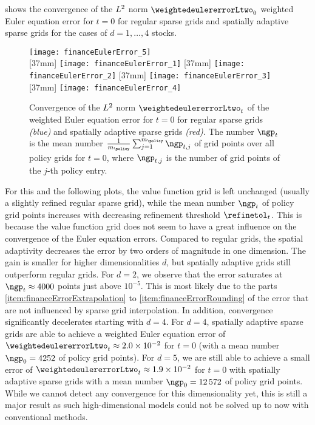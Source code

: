  shows the convergence of the
$L^2$ norm $\weightedeulererrorLtwo_0$
weighted Euler equation error for $t = 0$ for regular sparse grids
and spatially adaptive sparse grids
for the cases of $d = 1, \dotsc, 4$ stocks.
\begin{figure}
  \texttt{[image: financeEulerError\_5]}%
  \\[2mm]%
  [37mm]{%
    \texttt{[image: financeEulerError\_1]}%
  }%
  \hfill%
  [37mm]{%
    \texttt{[image: financeEulerError\_2]}%
  }%
  \hfill%
  [37mm]{%
    \texttt{[image: financeEulerError\_3]}%
  }%
  \hfill%
  [37mm]{%
    \texttt{[image: financeEulerError\_4]}%
  }%
  \caption[Convergence of the weighted Euler equation error]{%
    Convergence of the $L^2$ norm $\weightedeulererrorLtwo_t$
    of the weighted Euler equation error for $t = 0$ for
    regular sparse grids \emph{\textcolor{C0}{(blue)}} and
    spatially adaptive sparse grids \emph{\textcolor{C1}{(red)}.}
    The number $\ngp_t$ is the mean number
    $\frac{1}{m_{\policy}} \sum_{j=1}^{m_{\policy}} \ngp_{t,j}$
    of grid points over all policy grids for $t = 0$,
    where $\ngp_{t,j}$ is the number of grid points
    of the $j$-th policy entry.%
  }%
  \label{fig:financeEulerError}%
\end{figure}%
For this and the following plots,
the value function grid is left unchanged
(usually a slightly refined regular sparse grid),
while the mean number $\ngp_t$ of policy grid points increases
with decreasing refinement threshold $\refinetol_t$.
This is because the value function grid does not seem to have a great influence
on the convergence of the Euler equation errors.
Compared to regular grids, the spatial adaptivity decreases the error by
two orders of magnitude in one dimension.
The gain is smaller for higher dimensionalities $d$,
but spatially adaptive grids still outperform regular grids.
For $d = 2$, we observe that the error saturates
at $\ngp_t \approx \num{4000}$ points just above $10^{-5}$.
This is most likely due to the parts
\ref{item:financeErrorExtrapolation} to
\ref{item:financeErrorRounding} of the error that are not influenced
by sparse grid interpolation.
In addition, convergence significantly decelerates starting with $d = 4$.
For $d = 4$, spatially adaptive sparse grids
are able to achieve a weighted Euler equation error of
$\weightedeulererrorLtwo_t \approx \num{2.0e-2}$ for $t = 0$
(with a mean number $\ngp_0 = \num{4252}$ of policy grid points).
For $d = 5$, we are still able to achieve a small error of
$\weightedeulererrorLtwo_t \approx \num{1.9e-2}$ for $t = 0$
with spatially adaptive sparse grids with
a mean number $\ngp_0 = \num{12572}$ of policy grid points.
While we cannot detect any convergence for this dimensionality yet,
this is still a major result as such high-dimensional models
could not be solved up to now with conventional methods.

